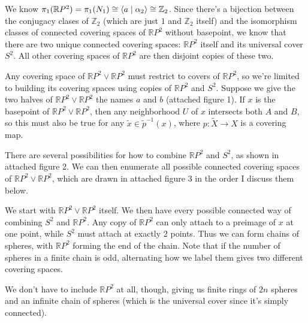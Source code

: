 \documentclass[twoside,10pt]{article}
\begin{document}
We know $\pi_1(\mathbb{R}P^2) = \pi_1(N_1) \cong \langle a \;|\; \alpha_2 \rangle\cong \mathbb{Z}_2$. Since there's a bijection between the conjugacy clases of $\mathbb{Z}_2$ (which are just $1$ and $\mathbb{Z}_2$ itself) and the isomorphism classes of connected covering spaces of $\mathbb{R}P^2$ without basepoint, we know that there are two unique connected covering spaces: $\mathbb{R}P^2$ itself and its universal cover $S^2$. All other covering spaces of $\mathbb{R}P^2$ are then disjoint copies of these two.

Any covering space of $\mathbb{R}P^2 \vee \mathbb{R}P^2$ must restrict to covers of $\mathbb{R}P^2$, so we're limited to building its covering spaces using copies of $\mathbb{R}P^2$ and $S^2$. Suppose we give the two halves of $\mathbb{R}P^2 \vee \mathbb{R}P^2$ the names $a$ and $b$ (attached figure 1). If $x$ is the basepoint of $\mathbb{R}P^2 \vee \mathbb{R}P^2$, then any neighborhood $U$ of $x$ intersects both $A$ and $B$, so this must also be true for any $\tilde{x} \in \tilde{p}^{-1}(x)$, where $p:\tilde{X}\to X$ is a covering map.

There are several possibilities for how to combine $\mathbb{R}P^2$ and $S^2$, as shown in attached figure 2. We can then enumerate all possible connected covering spaces of $\mathbb{R}P^2 \vee \mathbb{R}P^2$, which are drawn in attached figure 3 in the order I discuss them below.

We start with $\mathbb{R}P^2 \vee \mathbb{R}P^2$ itself. We then have every possible connected way of combining $S^2$ and $\mathbb{R}P^2$. Any copy of $\mathbb{R}P^2$ can only attach to a preimage of $x$ at one point, while $S^2$ must attach at exactly 2 points. Thus we can form chains of spheres, with $\mathbb{R}P^2$ forming the end of the chain. Note that if the number of spheres in a finite chain is odd, alternating how we label them gives two different covering spaces.

We don't have to include $\mathbb{R}P^2$ at all, though, giving us finite rings of $2n$ spheres and an infinite chain of spheres (which is the universal cover since it's simply connected).

\newpage
\end{document}
